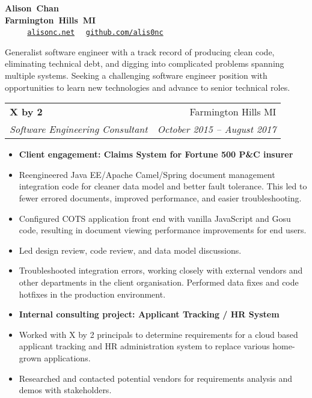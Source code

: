\documentclass[letterpaper,10pt]{article}
\makeatletter
\newlength{\listsep}
\newcommand{\resitem}[1]{\item #1 \vspace{-2pt}}
\newcommand{\resheading}[1]{\vspace{4pt}
  \parbox{\textwidth}{
      \framebox[\textwidth][l]{
          {\textbf{\sffamily{\large #1}}}
      }
  }
}
\newcommand{\ressubheading}[4]{
\begin{tabular*}{\textwidth}{l@{\cftdotfill{\cftsecdotsep}\extracolsep{\fill}}r}
        \textbf{#1} & #2 \\
        \textit{#3} & \textit{#4} \\
\end{tabular*}\vspace{-6pt}}
\makeatother
\begin{document}
\ifdef{\MONSTER}{\def\PUBLIC{}}{}
\ifdef{\DICE}{\def\PUBLIC{}}{}

\parbox{\textwidth}{\centering
    \textbf{{\Large Alison~Chan}} \\
    \textbf{Farmington~Hills~MI} \\
    ~\textbullet~%
    ~\textbullet~%
    \href{https://alisonc.net/}{\nolinkurl{alisonc.net}}~\textbullet~%
    \href{https://github.com/alis0nc}{\nolinkurl{github.com/alis0nc}}
}
\vspace{6pt}

{\large
Generalist software engineer with a track record of producing clean code, eliminating technical debt,
and digging into complicated problems spanning multiple systems. 
Seeking a challenging software engineer position with opportunities to learn new technologies and advance to senior technical roles.
}

\resheading{Professional Experience}


\ressubheading{X by 2}{Farmington Hills MI}{Software Engineering Consultant}{October 2015 -- August 2017}
\begin{itemize}\itemsep \listsep  \small
    \resitem{{\bf Client engagement: Claims System for Fortune 500 P\&C insurer}}
    \resitem{Reengineered Java EE/Apache Camel/Spring document management integration code for cleaner data model 
    	     and better fault tolerance. This led to fewer errored documents, improved performance, and easier troubleshooting.}
    \resitem{Configured COTS application front end with vanilla JavaScript and Gosu code, resulting in document viewing 
    	     performance improvements for end users.}
    \resitem{Led design review, code review, and data model discussions.}
    \resitem{Troubleshooted integration errors, working closely with external vendors and other departments in the client 
    	     organisation. Performed data fixes and code hotfixes in the production environment.}
    \resitem{{\bf Internal consulting project: Applicant Tracking / HR System}}
    \resitem{Worked with X by 2 principals to determine requirements for a cloud based applicant tracking
             and HR administration system to replace various home-grown applications.}
    \resitem{Researched and contacted potential vendors for requirements analysis and demos with stakeholders.}
\end{itemize}
\end{document}

